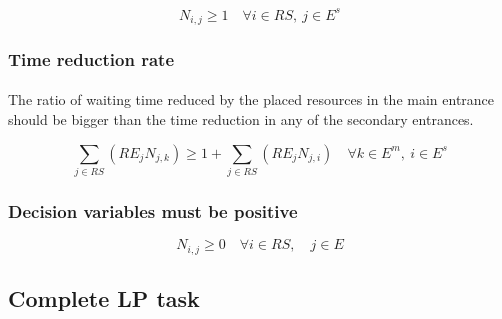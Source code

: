 \begin{equation}
    N_{i,j} \geq 1 \quad \forall i \in RS,\ j \in E^s
\end{equation}




\subsubsection{Time reduction rate}

\paragraph{}
The ratio of waiting time reduced by the placed resources in the main entrance should be bigger than the time reduction in any of the secondary entrances.

\begin{equation}
    \sum_{j \in RS}\left({RE_j N_{j,k}}\right) \geq 1 + \sum_{j \in RS}\left({RE_j N_{j,i}}\right) \quad \forall k \in E^m,\ i \in E^s
\end{equation}





\subsubsection{Decision variables must be positive}
\begin{equation}
    N_{i,j} \geq 0 \quad \forall i \in RS, \quad j \in E
\end{equation}







\subsection{Complete LP task}

